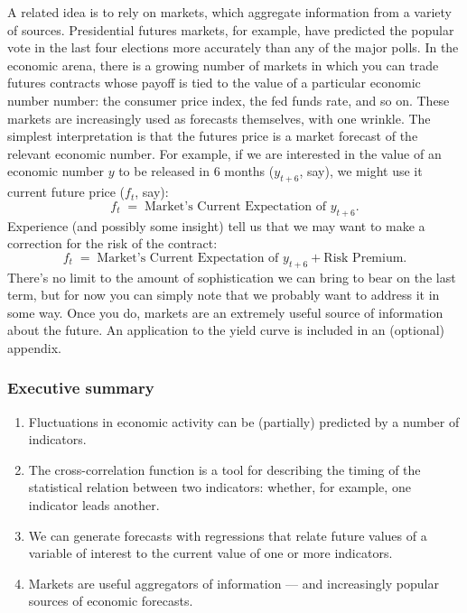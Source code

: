 \documentclass[letterpaper,12pt]{article}
\begin{document}
A related idea is to rely on markets, which aggregate information
from a variety of sources.  Presidential futures markets, for
example, have predicted the popular vote in the last four
elections more accurately than any of the major polls.  
In the economic arena, there is a growing number of markets
in which you can trade futures contracts whose payoff is tied 
to the value of a particular economic number number:
the consumer price index, the fed funds rate, and so on.
These markets are increasingly used as forecasts themselves, with one wrinkle.
The simplest interpretation is that the futures price is a market forecast 
of the relevant economic number.  
For example, if we are interested in the value of an economic number $y$
to be released in 6 months ($y_{t+6}$, say), 
we might use it current future price ($f_t$, say): 
\[
    f_t  \;=\;  \mbox{Market's Current Expectation of  } y_{t+6} .
\]
Experience (and possibly some insight) tell us that we may want to make a
correction for the risk of the contract:  
\[
    f_t  \;=\;  \mbox{Market's Current Expectation of  } y_{t+6}  
                + \mbox{Risk Premium} .
\]
There's no limit to the amount of sophistication 
we can bring to bear on the last term, 
but for now you can simply note that 
we probably want to address it in some way.
Once you do, markets are an extremely useful source of information
about the future.  
An application to the yield curve is included in an (optional) 
appendix. 


\subsubsection*{Executive summary}

\begin{enumerate}
\item Fluctuations in economic activity can be (partially)
predicted by a number of indicators.  

\item The cross-correlation function is a tool for describing the 
timing of the statistical relation between two indicators:
whether, for example, one indicator leads another.    

\item We can generate forecasts with regressions that relate
future values of a variable of interest to the current value of
one or more indicators. 

\item Markets are useful aggregators of information ---  
and increasingly popular sources of economic forecasts.

\end{enumerate}
\end{document}
